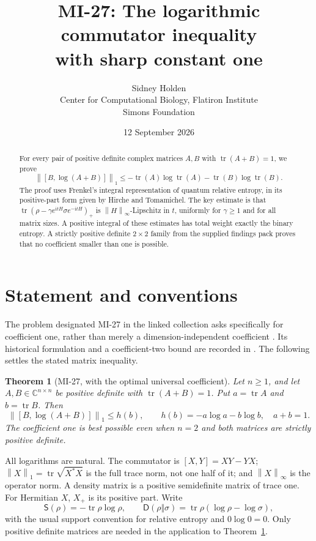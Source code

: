 \documentclass[11pt]{article}
\title{\textbf{MI-27: The logarithmic commutator inequality\\with sharp constant one}}
\author{Sidney Holden\\{\small Center for Computational Biology, Flatiron Institute}\\{\small Simons Foundation}}
\date{12 September 2026}
\numberwithin{equation}{section}
\newtheorem{theorem}{Theorem}[section]
\theoremstyle{remark}
\DeclareMathOperator{\tr}{tr}
\newcommand{\one}[1]{\left\lVert #1\right\rVert_1}
\newcommand{\op}[1]{\left\lVert #1\right\rVert_\infty}
\newcommand{\ent}{\mathsf S}
\newcommand{\rel}{\mathsf D}
\newcommand{\ii}{\mathrm i}
\newcommand{\C}{\mathbb C}
\begin{document}
\maketitle
\thispagestyle{empty}

\begin{abstract}
For every pair of positive definite complex matrices $A,B$ with
$\tr(A+B)=1$, we prove
\[
 \one{[B,\log(A+B)]}\le
 -\tr(A)\log\tr(A)-\tr(B)\log\tr(B).
\]
The proof uses Frenkel's integral representation of quantum relative
entropy, in its positive-part form given by Hirche and Tomamichel.
The key estimate is that $\tr(\rho-\gamma e^{\ii tH}\sigma e^{-\ii tH})_+$
is $\op{H}$-Lipschitz in $t$, uniformly for $\gamma\ge1$ and for all
matrix sizes. A positive integral of these estimates has total weight
exactly the binary entropy. A strictly positive definite $2\times2$
family from the supplied findings pack proves that no coefficient
smaller than one is possible.
\end{abstract}

\section{Statement and conventions}

The problem designated MI-27 in the linked collection asks specifically
for coefficient one, rather than merely a dimension-independent
coefficient \cite{MI27}. Its historical formulation and a coefficient-two
bound are recorded in \cite{AK,Audenaert}. The following settles the
stated matrix inequality.

\begin{theorem}[MI-27, with the optimal universal coefficient]
\label{thm:main}
Let $n\ge1$, and let $A,B\in\C^{n\times n}$ be positive definite with
$\tr(A+B)=1$. Put $a=\tr A$ and $b=\tr B$. Then
\begin{equation}
 \boxed{\one{[B,\log(A+B)]}\le h(b)},
 \qquad h(b)=-a\log a-b\log b,\quad a+b=1.
 \label{eq:main}
\end{equation}
The coefficient one is best possible even when $n=2$ and both matrices
are strictly positive definite.
\end{theorem}

All logarithms are natural. The commutator is $[X,Y]=XY-YX$;
$\one{X}=\tr\sqrt{X^*X}$ is the full trace norm, not one half of it;
and $\op{X}$ is the operator norm. A density matrix is a positive
semidefinite matrix of trace one. For Hermitian $X$, $X_+$ is its positive
part. Write
\[
 \ent(\rho)=-\tr\rho\log\rho,\qquad
 \rel(\rho\Vert\sigma)=\tr\rho(\log\rho-\log\sigma),
\]
with the usual support convention for relative entropy and $0\log0=0$.
Only positive definite matrices are needed in the application to
Theorem~\ref{thm:main}.
\end{document}

